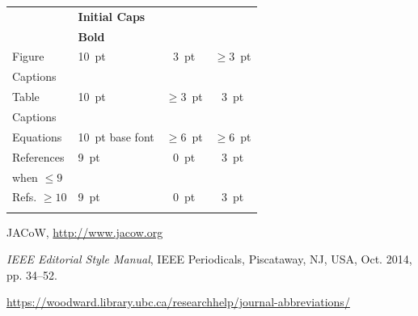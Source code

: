 \documentclass[letter,
               biblatex,     %
               keeplastbox,   %
               ]{jacow}
\begin{document}
\begin{table}[h!b]
\begin{tabular}{llcc}
                            & \textbf{Initial Caps}       &                 &      \\
		& \textbf{Bold}               &                 &      \\[5pt]
		Figure        & \SI{10}{pt}                 & \SI{3}{pt}      & $\ge$\SI{3}{pt}  \\
		Captions      &                             &                 &      \\[5pt]
		Table         & \SI{10}{pt}                 & $\ge$\SI{3}{pt} & \SI{3}{pt}  \\
		Captions	  &                             &                 &      \\[5pt]
		Equations     & \SI{10}{pt} base font       & $\ge$\SI{6}{pt}     & $\ge$\SI{6}{pt} \\[5pt]
		References      & \SI{9}{pt}				& \SI{0}{pt}      & \SI{3}{pt} \\
        when $\le9$ 	& \verb||	&                 &  \\[5pt]
        Refs. $\ge10$ 	& \SI{9}{pt}				& \SI{0}{pt}      & \SI{3}{pt}  \\
                		& \verb||	&    &    \\
		\bottomrule   %
	\end{tabular}
\end{table}


%
%
%
	{\printbibliography}%
	{%
	
	\begin{thebibliography}{9} %
	
		JACoW,
		\url{http://www.jacow.org}
	
		\textit{IEEE Editorial Style Manual},
		IEEE Periodicals, Piscataway,
		NJ, USA, Oct. 2014, pp. 34--52.

	\url{https://woodward.library.ubc.ca/researchhelp/journal-abbreviations/}

	\end{thebibliography}
} %
\end{document}
